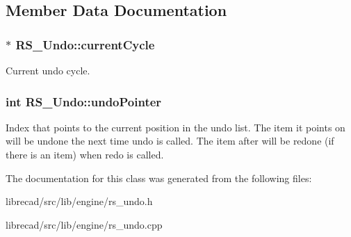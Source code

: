 \subsection{Member Data Documentation}
\hypertarget{classRS__Undo_a0e92a818317a5de8c3cad84e6c1bebb1}{
\subsubsection[{current\-Cycle}]{$\ast$ R\-S\-\_\-\-Undo\-::current\-Cycle\hspace{0.3cm}{\ttfamily [protected]}}}\label{classRS__Undo_a0e92a818317a5de8c3cad84e6c1bebb1}
Current undo cycle. \hypertarget{classRS__Undo_abfa9454560fba30af5c06a506b07fc89}{
\subsubsection[{undo\-Pointer}]{\setlength{\rightskip}{0pt plus 5cm}int R\-S\-\_\-\-Undo\-::undo\-Pointer\hspace{0.3cm}{\ttfamily [protected]}}}\label{classRS__Undo_abfa9454560fba30af5c06a506b07fc89}
Index that points to the current position in the undo list. The item it points on will be undone the next time undo is called. The item after will be redone (if there is an item) when redo is called. 

The documentation for this class was generated from the following files\-:\begin{DoxyCompactItemize}
\item 
librecad/src/lib/engine/rs\-\_\-undo.\-h\item 
librecad/src/lib/engine/rs\-\_\-undo.\-cpp\end{DoxyCompactItemize}

